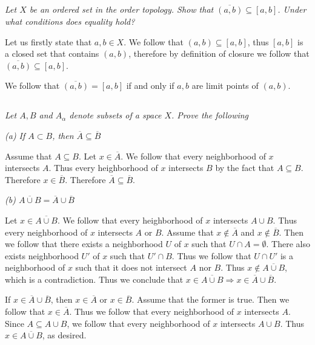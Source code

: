 \documentclass[11pt,oneside,titlepage]{book}
\DeclareMathOperator \ra {\Rightarrow}
\begin{document}
\subsection{}

\textit{Let $X$ be an ordered set in the order topology. Show that
  $\overline{(a, b)} \subseteq [a, b]$. Under what conditions
  does equality hold?}

Let us firstly state that $a, b \in X$.
We follow that $(a, b) \subseteq [a, b]$, thus $[a, b]$ is a closed set that contains
$(a, b)$, therefore by definition of closure we follow that $\overline{(a, b)} \subseteq [a, b]$.

We follow that $\overline{(a, b)} = [a, b]$ if and only if $a, b$ are limit points of
$(a, b)$.

\subsection{}

\textit{Let $A, B$ and $A_\alpha$ denote subsets of a space $X$. Prove the following}

\textit{(a) If $A \subset B$, then $\overline{A} \subseteq \overline{B}$}

Assume that $A \subseteq B$. Let $x \in \overline{A}$. We follow that
every neighborhood of $x$ intersects $A$. Thus every heighborhood of $x$ intersects $B$
by the fact that $A \subseteq B$. 
Therefore $x \in \overline{B}$. Therefore $\overline{A} \subseteq \overline{B}$.

\textit{(b) $\overline{A \cup B} = \overline{A} \cup \overline{B}$}

Let $x \in \overline{A \cup B}$. We follow that every heighborhood of $x$
intersects $A \cup B$. Thus every neighborhood of $x$ intersects $A$ or $B$.
Assume that $x \notin \overline{A}$ and $x \notin \overline{B}$. Then we follow that
there exists a neighborhood $U$ of $x$ such that $U \cap A = \emptyset$.
There also exists neighborhood $U'$ of $x$ such that $U' \cap B$.
Thus we follow that $U \cap U'$ is a neighborhood of $x$ such that it does
not intersect $A$ nor $B$. Thus $x \notin \overline{A \cup B}$, which is a contradiction.
Thus we conclude that $x \in \overline{A \cup B} \ra x \in \overline{A} \cup \overline{B}$.

If $x \in \overline{A} \cup \overline{B}$, then $x \in \overline{A}$ or $x \in \overline{B}$.
Assume that the former is true. Then we follow that $x \in \overline{A}$.
Thus we follow that every neighborhood of $x$ intersects $A$. Since $A \subseteq A \cup B$,
we follow that every neighborhood of $x$ intersects $A \cup B$. Thus $x \in \overline{A \cup B}$,
as desired.
\end{document}
